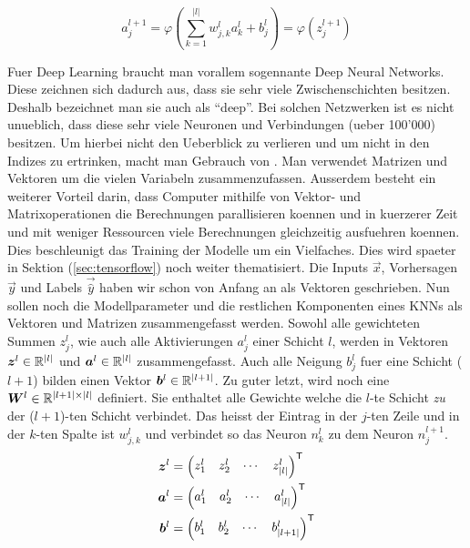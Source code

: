 \begin{equation}\tag{FP2}\label{eq:aktivierung_normal}
  a_j^{l+1} = \varphi\left(\sum_{k=1}^{|l|} w_{j,k}^l a_k^{l} + b_j^l \right) = \varphi \left( z_j^{l+1} \right)
\end{equation}
\par\bigskip
Fuer Deep Learning braucht man vorallem sogennante Deep Neural Networks. Diese
zeichnen sich dadurch aus, dass sie sehr viele Zwischenschichten besitzen.
Deshalb bezeichnet man sie auch als ``deep''.
Bei solchen Netzwerken ist es nicht unueblich,
dass diese sehr viele Neuronen und Verbindungen (ueber 100'000) besitzen.
Um hierbei nicht den Ueberblick zu verlieren und um nicht in den Indizes zu
ertrinken, macht man Gebrauch von . Man verwendet
Matrizen und Vektoren um die vielen Variabeln zusammenzufassen.
Ausserdem besteht ein weiterer Vorteil darin, dass Computer mithilfe von Vektor-
und Matrixoperationen die Berechnungen parallisieren koennen und in kuerzerer
Zeit und mit weniger Ressourcen viele Berechnungen gleichzeitig ausfuehren koennen.
Dies beschleunigt das Training der Modelle um
ein Vielfaches. Dies wird spaeter in Sektion
(\ref{sec:tensorflow}) noch weiter thematisiert.
\para{}
Die Inputs $\vec{x}$, Vorhersagen $\vec{y}$ und Labels $\vec{\hat{y}}$ haben wir schon von Anfang an als Vektoren geschrieben.
Nun sollen noch die Modellparameter und die restlichen Komponenten eines KNNs als Vektoren und Matrizen zusammengefasst werden.
Sowohl alle gewichteten Summen $z_j^l$, wie auch alle Aktivierungen $a_j^l$
einer Schicht $l$, werden in Vektoren $\bm{z}^l \in \mathbb{R}^{|l|}$ und
$\bm{a}^l \in \mathbb{R}^{|l|}$ zusammengefasst.
Auch alle Neigung $b_j^l$ fuer eine Schicht ($l+1$) bilden einen Vektor
$\bm{b}^l \in \mathbb{R}^{|l+1|}$.
\para{}
Zu guter letzt, wird noch eine  $\bm{W}^l \in
\mathbb{R}^{|l+1| \times |l|}$
definiert. Sie enthaltet alle Gewichte welche die $l$-te
Schicht \textit{zu} der ($l+1$)-ten Schicht verbindet.
Das heisst der Eintrag in der $j$-ten Zeile und in
der $k$-ten Spalte ist $w_{j,k}^l$ und verbindet so das Neuron $n_k^{l}$ zu
dem Neuron $n_j^{l+1}$.
\\
\begin{align*}
  \bm{z}^l &=  \begin{pmatrix} z_1^l & z_2^l & \cdots & z_{|l|}^l \end{pmatrix}^{\mathsf{T}} \\
  \bm{a}^l &=  \begin{pmatrix} a_1^l & a_2^l & \cdots & a_{|l|}^l \end{pmatrix}^{\mathsf{T}} \\
  \bm{b}^l &=  \begin{pmatrix} b_1^l & b_2^l & \cdots & b_{|l+1|}^l \end{pmatrix}^{\mathsf{T}} \\
\end{align*}
